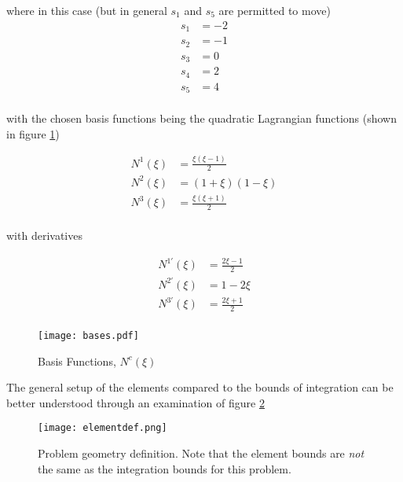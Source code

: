 where in this case (but in general $s_1$ and $s_5$ are permitted to move)
\begin{equation}
\begin{aligned}
s_1 &= -2\\
s_2 &= -1\\
s_3 &= 0\\
s_4 &= 2\\
s_5 &= 4\\
\end{aligned}
\end{equation}

with the chosen basis functions being the quadratic Lagrangian functions (shown in figure \ref{fig:bases})

\begin{equation}
\begin{aligned}
N^1(\xi) &= \frac{\xi(\xi-1)}{2}\\
N^2(\xi) &= (1+\xi)(1-\xi)\\
N^3(\xi) &=  \frac{\xi(\xi+1)}{2}\\
\end{aligned}
\end{equation}

with derivatives

\begin{equation}
\begin{aligned}
N^{1'}(\xi) &= \frac{2\xi-1}{2}\\
N^{2'}(\xi) &= 1-2\xi\\
N^{3'}(\xi) &=  \frac{2\xi+1}{2}\\
\end{aligned}
\end{equation}

\begin{figure}[htb]
	\centering
	\texttt{[image: bases.pdf]}
	\caption{Basis Functions, $N^c(\xi)$}
	\label{fig:bases}
\end{figure}

The general setup of the elements compared to the bounds of integration can be better understood through an examination of figure \ref{fig:elementdef}

\begin{figure}[htb]
	\centering
	\texttt{[image: elementdef.png]}
	\caption{Problem geometry definition. Note that the element bounds are \textit{not} the same as the integration bounds for this problem.\cite{Guiggiani1987Direct-computat}}
	\label{fig:elementdef}
\end{figure}


